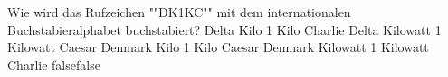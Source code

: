     {Wie wird das Rufzeichen ""DK1KC"" mit dem internationalen Buchstabieralphabet  buchstabiert?}
    {Delta Kilo 1 Kilo Charlie}
    {Delta Kilowatt 1 Kilowatt Caesar}
    {Denmark Kilo 1 Kilo Caesar}
    {Denmark Kilowatt 1 Kilowatt Charlie}
    {false}{false}